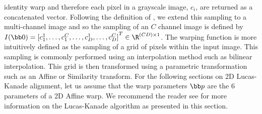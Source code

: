 identity warp and therefore each pixel in a grayscale image, $c_i$, are returned
as a concatenated vector. Following the definition of
\citet{antonakos2015feature}, we extend this sampling to a multi-channel image
and so the sampling of an $C$ channel image is defined by
$I(\zero) = {[c^1_1, \ldots, c^C_1, \ldots, c^1_D, \ldots, c^C_D]}^T \in \R^{(CD) \times 1}$.
The warping function is more intuitively defined as the sampling of a grid
of pixels within the input image. This sampling is commonly performed using
an interpolation method such as bilinear interpolation. This grid is then
transformed using a parametric transformation such as an Affine or Similarity
transform. For the following sections on 2D Lucas-Kanade alignment, let us
assume that the warp parameters $\p$ are the $6$ parameters of a 2D Affine warp.
We recommend the reader see \citet{baker2004lucas} for more information on the
Lucas-Kanade algorithm as presented in this section.
